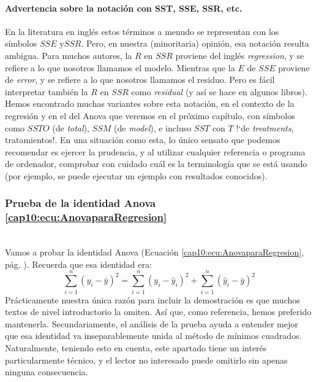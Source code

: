 \paragraph{Advertencia sobre la notación con SST, SSE, SSR, etc.}
\label{cap10:parag:AdvertenciaSSE} En la literatura en inglés  estos términos a menudo se
representan con los símbolos $SSE$ y$SSR$. Pero, en nuestra (minoritaria) opinión, esa notación
resulta ambigua. Para muchos autores, la $R$ en $SSR$ proviene del inglés {\em regression}, y
se refiere a lo que nosotros llamamos el modelo. Mientras que la $E$ de $SSE$ proviene de {\em
error}, y se refiere a lo que nosotros llamamos el residuo. Pero es fácil interpretar también la $R$
en $SSR$ como {\em residual} (y así se hace en algunos libros). Hemos encontrado muchas variantes
sobre esta notación, en el contexto de la regresión y en el del Anova que veremos en el próximo
capítulo,  con símbolos como $SSTO$ (de {\em total}), $SSM$ (de {\em model}), e incluso $SST$ con $T$ {!`}de {\em treatments}, tratamientos!. En una situación como esta, lo único sensato que podemos recomendar
es ejercer la prudencia, y al utilizar cualquier referencia o programa de ordenador, comprobar con
cuidado cuál es la terminología que se está usando (por ejemplo, se puede ejecutar un ejemplo con
resultados conocidos).

\subsubsection{Prueba de la identidad Anova \ref{cap10:ecu:AnovaparaRegresion}}
\\

Vamos a probar la identidad Anova (Ecuación \ref{cap10:ecu:AnovaparaRegresion}, pág. \pageref{cap10:ecu:AnovaparaRegresion}). Recuerda que esa identidad era:
\[
    \displaystyle\sum_{i=1}^{n}(y_i-\bar y)^2 =
    \sum_{i=1}^n(y_i-\hat y_i)^2 +\sum_{i=1}^n(\hat y_i-\bar y)^2
\]
Prácticamente nuestra única razón para incluir la demostración es que muchos textos de nivel introductorio la omiten. Así que, como referencia, hemos preferido mantenerla. Secundariamente, el análisis de la prueba ayuda a entender mejor que esa identidad va inseparablemente  unida al método de mínimos cuadrados. Naturalmente, teniendo esto en cuenta, este apartado tiene un interés particularmente técnico, y el lector no interesado puede omitirlo sin apenas ninguna consecuencia.

